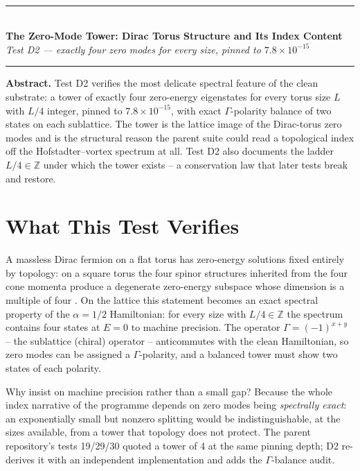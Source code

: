 \documentclass[11pt,a4paper]{article}
\begin{document}
\\[0.3em]
\rule{\textwidth}{0.8pt}\\[0.6em]
{\LARGE\bfseries\color{labblue} The Zero-Mode Tower: Dirac Torus Structure and Its Index Content}\\[0.5em]
{\normalsize\itshape Test D2 — exactly four zero modes for every size, pinned to $7.8\times10^{-15}$}\\[0.4em]
\rule{\textwidth}{0.4pt}

\begin{tcolorbox}[colback=labgreen!8, colframe=labgreen!70!black, title={Verdict: PASS — 4/4 checks}, fonttitle=\bfseries, boxrule=0.6pt]
\textbf{Abstract.} Test D2 verifies the most delicate spectral feature of the clean substrate: a tower of exactly four zero-energy eigenstates for every torus size $L$ with $L/4$ integer, pinned to $7.8\times10^{-15}$, with exact $\Gamma$-polarity balance of two states on each sublattice. The tower is the lattice image of the Dirac-torus zero modes and is the structural reason the parent suite could read a topological index off the Hofstadter--vortex spectrum at all. Test D2 also documents the ladder $L/4 \in \mathbb{Z}$ under which the tower exists -- a conservation law that later tests break and restore.
\end{tcolorbox}

\section{What This Test Verifies}
A massless Dirac fermion on a flat torus has zero-energy solutions fixed entirely by topology: on a square torus the four spinor structures inherited from the four cone momenta produce a degenerate zero-energy subspace whose dimension is a multiple of four \cite{dirac,parent}. On the lattice this statement becomes an exact spectral property of the $\alpha = 1/2$ Hamiltonian: for every size with $L/4 \in \mathbb{Z}$ the spectrum contains four states at $E = 0$ to machine precision. The operator $\Gamma = (-1)^{x+y}$ -- the sublattice (chiral) operator -- anticommutes with the clean Hamiltonian, so zero modes can be assigned a $\Gamma$-polarity, and a balanced tower must show two states of each polarity.

Why insist on machine precision rather than a small gap? Because the whole index narrative of the programme depends on zero modes being \emph{spectrally exact}: an exponentially small but nonzero splitting would be indistinguishable, at the sizes available, from a tower that topology does not protect. The parent repository's tests 19/29/30 quoted a tower of 4 at the same pinning depth; D2 re-derives it with an independent implementation and adds the $\Gamma$-balance audit.
\end{document}
